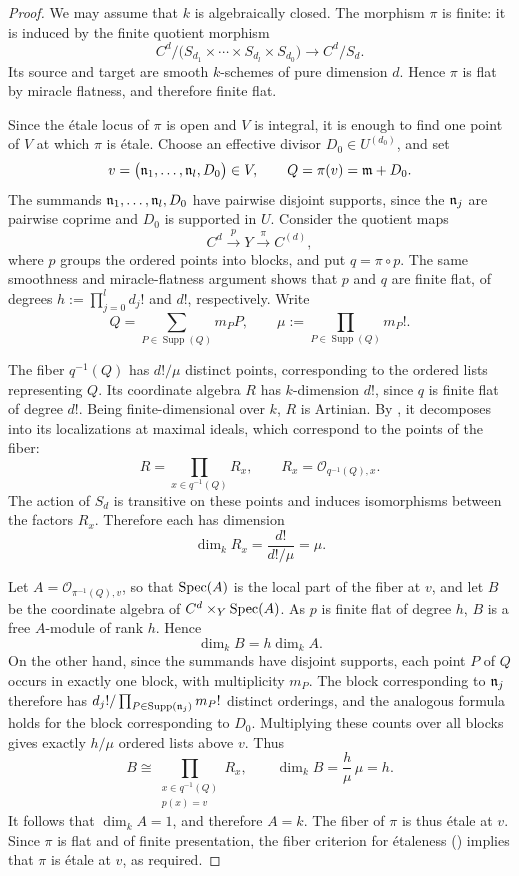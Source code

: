 \begin{proof}
We may assume that $k$ is algebraically closed. The morphism $\pi$ is
finite: it is induced by the finite quotient morphism
\[
C^d/\bigl(S_{d_1}\times\cdots\times S_{d_l}\times S_{d_0}\bigr)
  \longrightarrow C^d/S_d.
\]
Its source and target are smooth $k$-schemes of pure dimension $d$.
Hence $\pi$ is flat by miracle flatness, and therefore finite flat.

Since the étale locus of $\pi$ is open and $V$ is integral, it is enough to
find one point of $V$ at which $\pi$ is étale. Choose an effective
divisor $D_0\in U^{(d_0)}$, and set
\[
v=\bigl(\mathfrak{n}_1,\ldots,\mathfrak{n}_l,D_0\bigr)\in V,
\qquad Q=\pi(v)=\mathfrak{m}+D_0.
\]
The summands $\mathfrak{n}_1,\ldots,\mathfrak{n}_l,D_0$ have pairwise disjoint
supports, since the $\mathfrak{n}_j$ are pairwise coprime and
$D_0$ is supported in $U$. Consider the quotient maps
\[
C^d\xrightarrow{\ p\ }
Y
\xrightarrow{\ \pi\ }C^{(d)},
\]
where $p$ groups the ordered points into blocks, and put $q=\pi\circ p$.
The same smoothness and miracle-flatness argument shows that $p$ and $q$
are finite flat, of degrees $h:=\prod_{j=0}^{l}d_j!$ and $d!$, respectively.
Write
\[
Q=\sum_{P\in\operatorname{Supp}(Q)}m_P P,
\qquad \mu:=\prod_{P\in\operatorname{Supp}(Q)}m_P!.
\]

The fiber $q^{-1}(Q)$ has $d!/\mu$ distinct points, corresponding to the
ordered lists representing $Q$. Its coordinate algebra $R$ has
$k$-dimension $d!$, since $q$ is finite flat of degree $d!$. Being
finite-dimensional over $k$, $R$ is Artinian. By , it
decomposes into its localizations at maximal ideals, which correspond to
the points of the fiber:
\[
R=\prod_{x\in q^{-1}(Q)}R_x,
\qquad R_x=\mathcal O_{q^{-1}(Q),x}.
\]
The action of $S_d$ is transitive on these points and induces isomorphisms
between the factors $R_x$. Therefore each has dimension
\[
\dim_k R_x=\frac{d!}{d!/\mu}=\mu.
\]

Let $A=\mathcal O_{\pi^{-1}(Q),v}$, so that $\operatorname{Spec}(A)$ is the local
part of the fiber at $v$, and let $B$ be the coordinate algebra of
$C^d\times_Y\operatorname{Spec}(A)$. As $p$ is finite flat of degree $h$, $B$ is a free
$A$-module of rank $h$. Hence
\[
\dim_k B=h\dim_k A.
\]
On the other hand, since the summands have disjoint supports, each point
$P$ of $Q$ occurs in exactly one block, with multiplicity $m_P$. The block
corresponding to $\mathfrak{n}_j$ therefore has
$d_j!/\prod_{P\in\operatorname{Supp}(\mathfrak{n}_j)}m_P!$ distinct orderings,
and the analogous formula holds for the block corresponding to $D_0$.
Multiplying these counts over all blocks gives exactly $h/\mu$ ordered
lists above $v$. Thus
\[
B\cong\prod_{\substack{x\in q^{-1}(Q)\\p(x)=v}}R_x,
\qquad
\dim_k B=\frac{h}{\mu}\,\mu=h.
\]
It follows that $\dim_k A=1$, and therefore $A=k$. The fiber of $\pi$ is
thus étale at $v$. Since $\pi$ is flat and of finite presentation, the
fiber criterion for étaleness () implies that $\pi$ is
étale at $v$, as required.
\end{proof}


